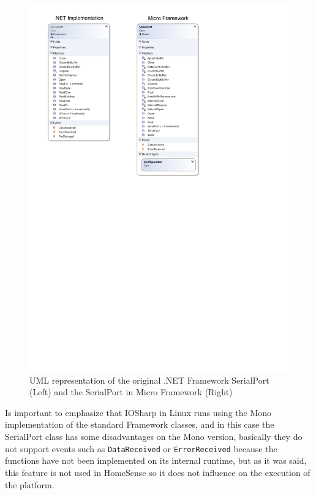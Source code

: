\begin{figure}[H]\begin{center}
 \centering
  \captionsetup{justification=centering}
  \includegraphics[scale=1]{pictures/iosharp/serialport-uml}
  \caption{UML representation of the original .NET Framework SerialPort (Left) and the SerialPort in Micro Framework (Right)\label{fig:serialport-uml}}
\end{center}\end{figure}

Is important to emphasize that IOSharp in Linux runs using the Mono implementation of the standard Framework classes, and in this case the SerialPort class has some disadvantages on the Mono version, basically they do not support events such as \verb!DataReceived! or \verb!ErrorReceived! because the functions have not been implemented on its internal runtime, but as it was said, this feature is not used in HomeSense so it does not influence on the execution of the platform.

